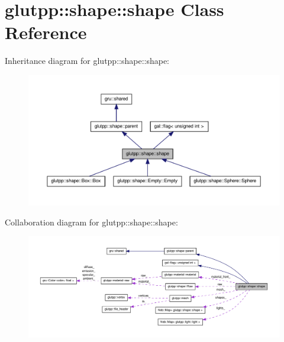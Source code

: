 \hypertarget{classglutpp_1_1shape_1_1shape}{\section{glutpp\-:\-:shape\-:\-:shape \-Class \-Reference}
\label{classglutpp_1_1shape_1_1shape}
}


\-Inheritance diagram for glutpp\-:\-:shape\-:\-:shape\-:
\nopagebreak
\begin{figure}[H]
\begin{center}
\leavevmode
\includegraphics[width=350pt]{classglutpp_1_1shape_1_1shape__inherit__graph}
\end{center}
\end{figure}


\-Collaboration diagram for glutpp\-:\-:shape\-:\-:shape\-:
\nopagebreak
\begin{figure}[H]
\begin{center}
\leavevmode
\includegraphics[width=350pt]{classglutpp_1_1shape_1_1shape__coll__graph}
\end{center}
\end{figure}

